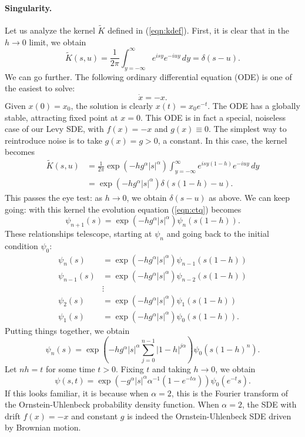 \documentclass[11pt,letterpaper]{article}
\begin{document}
\paragraph{Singularity.} Let us analyze the kernel $\widetilde{K}$ defined in (\ref{eqn:kdef}).  First, it is clear that in the $h \to 0$ limit, we obtain
\[
\widetilde{K}(s,u) = \frac{1}{2\pi}\int_{y=-\infty}^{\infty}e^{is y} e^{-iuy}\, dy = \delta(s - u).
\]
We can go further.  The following ordinary differential equation (ODE) is one of the easiest to solve:
\[
\dot{x} = -x.
\]
Given $x(0) = x_0$, the solution is clearly $x(t) = x_0 e^{-t}$.  The ODE has a globally stable, attracting fixed point at $x = 0$.  This ODE is in fact a special, noiseless case of our Levy SDE, with $f(x) = -x$ and $g(x) \equiv 0$.  The simplest way to reintroduce noise is to take $g(x) = g > 0$, a constant.  In this case, the kernel becomes
\begin{align}
\widetilde{K}(s,u) &= \frac{1}{2\pi} \exp{\left(  -h g^\alpha |s|^{\alpha} \right)} \int_{y=-\infty}^{\infty}e^{is y \left(1 - h\right)} e^{-iuy}\, dy \nonumber \\
\label{eqn:OUprop}
 &= \exp{\left(  -h g^\alpha |s|^{\alpha} \right)} \delta( s(1-h) - u).
\end{align}
This passes the eye test: as $h \to 0$, we obtain $\delta(s-u)$ as above.  We can keep going: with this kernel the evolution equation (\ref{eqn:ctq}) becomes
\[
\psi_{n+1}(s) = \exp{\left(  -h g^\alpha |s|^{\alpha} \right)} \psi_n( s(1-h) ).
\]
These relationships telescope, starting at $\psi_n$ and going back to the initial condition $\psi_0$:
\begin{align*}
\psi_{n}(s) &= \exp{\left(  -h g^\alpha |s|^{\alpha} \right)} \psi_{n-1}( s(1-h) ) \\
\psi_{n-1}(s) &= \exp{\left(  -h g^\alpha |s|^{\alpha} \right)} \psi_{n-2}( s(1-h) ) \\
&\vdots \\
\psi_{2}(s) &= \exp{\left(  -h g^\alpha |s|^{\alpha} \right)} \psi_1( s(1-h) ) \\
\psi_{1}(s) &= \exp{\left(  -h g^\alpha |s|^{\alpha} \right)} \psi_0( s(1-h) ).
\end{align*}
Putting things together, we obtain
\[
\psi_{n}(s) = \exp \left( -h g^\alpha |s|^\alpha \sum_{j=0}^{n-1} |1-h|^{j \alpha} \right) \psi_0( s (1-h)^n ).
\]
Let $n h = t$ for some time $t > 0$.  
Fixing $t$ and taking $h \to 0$, we obtain
\[
\psi(s, t) = \exp{ \left( - g^\alpha |s|^{\alpha} \alpha^{-1} (1 - e^{-t \alpha}) \right)} \psi_0( e^{-t} s ).
\]
If this looks familiar, it is because when $\alpha = 2$, this is the Fourier transform of the Ornstein-Uhlenbeck probability density function.  When $\alpha=2$, the SDE with drift $f(x) = -x$ and constant $g$ is indeed the Ornstein-Uhlenbeck SDE driven by Brownian motion.
\end{document}
